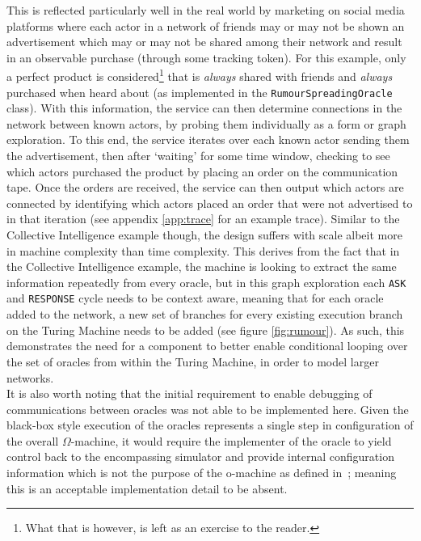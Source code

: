 \documentclass[12pt]{article}
\begin{document}
		This is reflected particularly well in the real world by marketing on social media platforms where each actor in a network of friends may or may not be shown an advertisement which may or may not be shared among their network and result in an observable purchase (through some tracking token).
		For this example, only a perfect product is considered\footnote{What that is however, is left as an exercise to the reader.} that is \textit{always} shared with friends and \textit{always} purchased when heard about (as implemented in the \texttt{RumourSpreadingOracle} class).
		With this information, the service can then determine connections in the network between known actors, by probing them individually as a form or graph exploration.
		To this end, the service iterates over each known actor sending them the advertisement, then after `waiting' for some time window, checking to see which actors purchased the product by placing an order on the communication tape.
		Once the orders are received, the service can then output which actors are connected by identifying which actors placed an order that were not advertised to in that iteration (see appendix \ref{app:trace} for an example trace).
		Similar to the Collective Intelligence example though, the design suffers with scale albeit more in machine complexity than time complexity.
		This derives from the fact that in the Collective Intelligence example, the machine is looking to extract the same information repeatedly from every oracle, but in this graph exploration each \texttt{ASK} and \texttt{RESPONSE} cycle needs to be context aware, meaning that for each oracle added to the network, a new set of branches for every existing execution branch on the Turing Machine needs to be added (see figure \ref{fig:rumour}).
		As such, this demonstrates the need for a component to better enable conditional looping over the set of oracles from within the Turing Machine, in order to model larger networks.\\
		It is also worth noting that the initial requirement to enable debugging of communications between oracles was not able to be implemented here.
		Given the black-box style execution of the oracles represents a single step in configuration of the overall $\Omega$-machine, it would require the implementer of the oracle to yield control back to the encompassing simulator and provide internal configuration information which is not the purpose of the o-machine as defined in~\cite{Turing1938}; meaning this is an acceptable implementation detail to be absent.
	
\end{document}
